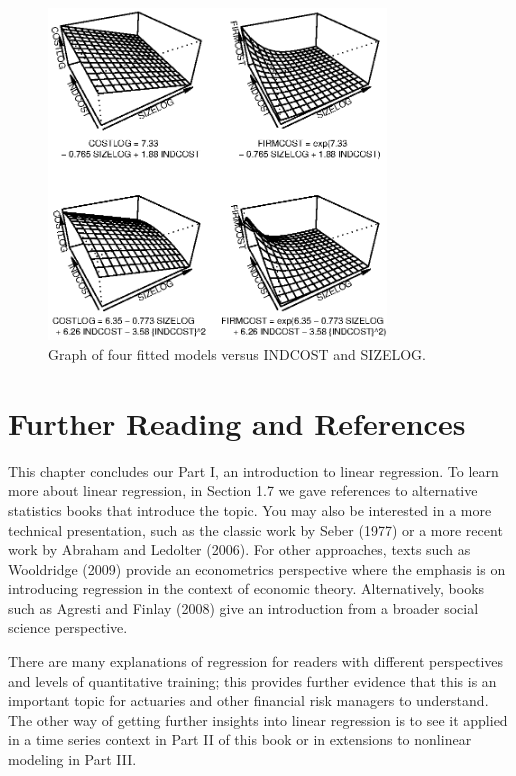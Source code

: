 \begin{figure}[htp]
  \begin{center}
   \includegraphics[width=0.8\textwidth]{Chapter6/F6SurveySummary.eps}
    \caption{\label{F6:SurveySummary} \small {Graph of four fitted
    models versus INDCOST and SIZELOG. }}
  \end{center}
\end{figure}


\section{Further Reading and References}

This chapter concludes our Part I, an introduction to linear
regression. To learn more about linear regression, in Section 1.7 we
gave references to alternative statistics books that introduce the
topic. You may also be interested in a more technical presentation,
such as the classic work by Seber (1977) or a more recent work by
Abraham and Ledolter (2006). For other approaches, texts such as
Wooldridge (2009) provide an econometrics perspective where the
emphasis is on introducing regression in the context of economic
theory. Alternatively, books such as Agresti and Finlay (2008) give
an introduction from a broader social science perspective.

There are many explanations of regression for readers with different
perspectives and levels of quantitative training; this provides
further evidence that this is an important topic for actuaries and
other financial risk managers to understand. The other way of
getting further insights into linear regression is to see it applied
in a time series context in Part II of this book or in extensions to
nonlinear modeling in Part III.


